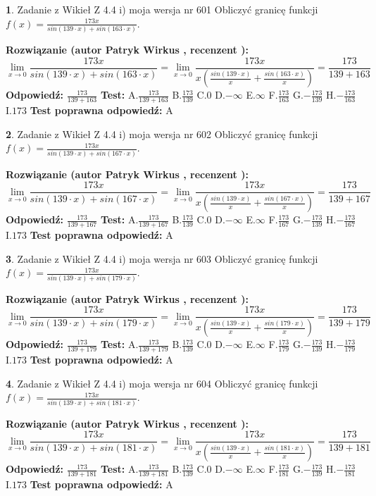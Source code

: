 \documentclass[12pt, a4paper]{article}
\theoremstyle{definition} %
\newtheorem{zad}{}
\newcommand{\zadStart}[1]{\begin{zad}#1\newline}
\newcommand{\zadStop}{\end{zad}}
\newcommand{\rozwStart}[2]{\noindent \textbf{Rozwiązanie (autor #1 , recenzent #2): }\newline}
\newcommand{\rozwStop}{\newline}
\newcommand{\odpStart}{\noindent \textbf{Odpowiedź:}\newline}
\newcommand{\odpStop}{\newline}
\newcommand{\testStart}{\noindent \textbf{Test:}\newline}
\newcommand{\testStop}{\newline}
\newcommand{\kluczStart}{\noindent \textbf{Test poprawna odpowiedź:}\newline}
\newcommand{\kluczStop}{\newline}
\begin{document}
\zadStart{Zadanie z Wikieł Z 4.4 i) moja wersja nr 601}
Obliczyć granicę funkcji $f(x)=\frac{173x}{sin(139\cdot x) +sin(163\cdot x)}$.
\zadStop
\rozwStart{Patryk Wirkus}{}
$$\lim\limits_{x\to 0}\frac{173x}{sin(139\cdot x) +sin(163\cdot x)}=\lim\limits_{x\to 0}\frac{173x}{x(\frac{sin(139\cdot x)}{x}+\frac{sin(163\cdot x)}{x})}=\frac{173}{139+163}$$
\rozwStop
\odpStart
$\frac{173}{139+163}$
\odpStop
\testStart
A.$\frac{173}{139+163}$
B.$\frac{173}{139}$
C.$0$
D.$-\infty$
E.$\infty$
F.$\frac{173}{163}$
G.$-\frac{173}{139}$
H.$-\frac{173}{163}$
I.$173$
\testStop
\kluczStart
A
\kluczStop



\zadStart{Zadanie z Wikieł Z 4.4 i) moja wersja nr 602}
Obliczyć granicę funkcji $f(x)=\frac{173x}{sin(139\cdot x) +sin(167\cdot x)}$.
\zadStop
\rozwStart{Patryk Wirkus}{}
$$\lim\limits_{x\to 0}\frac{173x}{sin(139\cdot x) +sin(167\cdot x)}=\lim\limits_{x\to 0}\frac{173x}{x(\frac{sin(139\cdot x)}{x}+\frac{sin(167\cdot x)}{x})}=\frac{173}{139+167}$$
\rozwStop
\odpStart
$\frac{173}{139+167}$
\odpStop
\testStart
A.$\frac{173}{139+167}$
B.$\frac{173}{139}$
C.$0$
D.$-\infty$
E.$\infty$
F.$\frac{173}{167}$
G.$-\frac{173}{139}$
H.$-\frac{173}{167}$
I.$173$
\testStop
\kluczStart
A
\kluczStop



\zadStart{Zadanie z Wikieł Z 4.4 i) moja wersja nr 603}
Obliczyć granicę funkcji $f(x)=\frac{173x}{sin(139\cdot x) +sin(179\cdot x)}$.
\zadStop
\rozwStart{Patryk Wirkus}{}
$$\lim\limits_{x\to 0}\frac{173x}{sin(139\cdot x) +sin(179\cdot x)}=\lim\limits_{x\to 0}\frac{173x}{x(\frac{sin(139\cdot x)}{x}+\frac{sin(179\cdot x)}{x})}=\frac{173}{139+179}$$
\rozwStop
\odpStart
$\frac{173}{139+179}$
\odpStop
\testStart
A.$\frac{173}{139+179}$
B.$\frac{173}{139}$
C.$0$
D.$-\infty$
E.$\infty$
F.$\frac{173}{179}$
G.$-\frac{173}{139}$
H.$-\frac{173}{179}$
I.$173$
\testStop
\kluczStart
A
\kluczStop



\zadStart{Zadanie z Wikieł Z 4.4 i) moja wersja nr 604}
Obliczyć granicę funkcji $f(x)=\frac{173x}{sin(139\cdot x) +sin(181\cdot x)}$.
\zadStop
\rozwStart{Patryk Wirkus}{}
$$\lim\limits_{x\to 0}\frac{173x}{sin(139\cdot x) +sin(181\cdot x)}=\lim\limits_{x\to 0}\frac{173x}{x(\frac{sin(139\cdot x)}{x}+\frac{sin(181\cdot x)}{x})}=\frac{173}{139+181}$$
\rozwStop
\odpStart
$\frac{173}{139+181}$
\odpStop
\testStart
A.$\frac{173}{139+181}$
B.$\frac{173}{139}$
C.$0$
D.$-\infty$
E.$\infty$
F.$\frac{173}{181}$
G.$-\frac{173}{139}$
H.$-\frac{173}{181}$
I.$173$
\testStop
\kluczStart
A
\kluczStop
\end{document}
